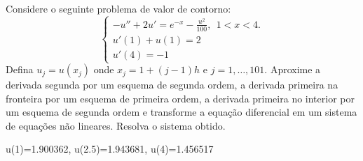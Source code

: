 \begin{Exercise} Considere o seguinte problema de valor de contorno:
$$\left\{\begin{array}{l}-u''+2u'=e^{-x}- \frac{u^2}{100},~~ 1<x<4.\\
u'(1)+u(1)=2\\
u'(4)=-1\end{array}
\right.
$$
Defina $u_j=u(x_j)$ onde $x_j=1+{(j-1)}{h}$ e $j=1,\ldots,101$. Aproxime a derivada segunda por um esquema de segunda ordem, a derivada primeira na fronteira por um esquema de primeira ordem, a derivada primeira no interior por um esquema de segunda ordem e transforme a equação diferencial em um sistema de equações não lineares. Resolva o sistema  obtido.
\end{Exercise}
\begin{Answer}
  \begin{tiny}
u(1)=1.900362, u(2.5)=1.943681, u(4)=1.456517    
  \end{tiny}
\end{Answer}

% 